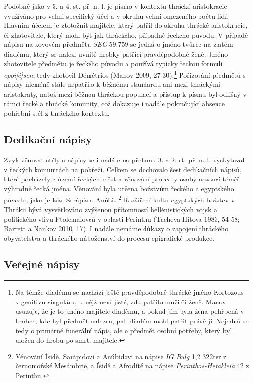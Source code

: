 Podobně jako v 5. a 4. st. př. n. l. je písmo v kontextu thrácké aristokracie využíváno pro velmi specifický účel a v okruhu velmi omezeného počtu lidí. Hlavním účelem je ztotožnit majitele, který patřil do okruhu thrácké aristokracie, či zhotovitele, který mohl být jak thráckého, případně řeckého původu. V případě nápisu na kovovém předmětu {\em SEG} 59:759 se jedná o jméno tvůrce na zlatém diadému, který se nalezl uvnitř hrobky patřící pravděpodobně ženě. Jméno zhotovitele předmětu je řeckého původu a používá typicky řeckou formuli {\em epoi{[}é{]}sen}, tedy zhotovil Démétrios (Manov 2009, 27-30).\footnote{Na témže diadému se nachází ještě pravděpodobně thrácké jméno Kortozous v genitivu singuláru, u nějž není jisté, zda patřilo muži či ženě. Manov usuzuje, že je to jméno majitele diadému, a pokud jím byla žena pohřbená v hrobce, kde byl předmět nalezen, pak diadém mohl patřit právě jí. Nejedná se tedy o primárně funerální nápis, ale o předmět osobní potřeby, který byl uložen do hrobu po smrti majitele.} Pořizování předmětů s nápisy nicméně stále nepatřilo k běžnému standardu ani mezi thráckými aristokraty, natož mezi běžnou thráckou populací a přístup k písmu byl odlišný v rámci řecké a thrácké komunity, což dokazuje i nadále pokračující absence pohřební stél z thráckého kontextu.

\subsection[dedikační-nápisy-6]{Dedikační nápisy}

Zvyk věnovat stély s nápisy se i nadále na přelomu 3. a 2. st. př. n. l. vyskytoval v řeckých komunitách na pobřeží. Celkem se dochovalo šest dedikačních nápisů, které pocházely z území řeckých měst a věnování provedly osoby nesoucí téměř výhradně řecká jména. Věnování byla určena božstvům řeckého a egyptského původu, jako je Ísis, Sarápis a Anúbis.\footnote{Věnování Ísidě, Sarápidovi a Anúbidovi na nápise {\em IG Bulg} 1,2 322ter z černomořské Mesámbrie, a Ísidě a Afrodíté na nápise {\em Perinthos-Herakleia} 42 z Perinthu.} Rozšíření kultu egyptských božstev v Thrákii bývá vysvětlováno zvýšenou přítomností hellénistických vojsk a politického vlivu Ptolemaiovců v oblasti Perinthu (Tacheva-Hitova 1983, 54-58; Barrett a Nankov 2010, 17). I nadále nemáme důkazy o zapojení thráckého obyvatelstva a thráckého náboženství do procesu epigrafické produkce.

\subsection[veřejné-nápisy-6]{Veřejné nápisy}

